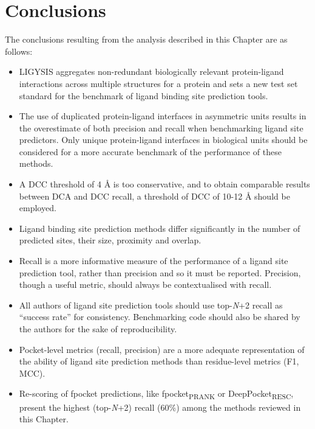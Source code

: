 \section{Conclusions}

The conclusions resulting from the analysis described in this Chapter are as follows:

\begin{itemize}

\item LIGYSIS aggregates non-redundant biologically relevant protein-ligand interactions across multiple structures for a protein and sets a new test set standard for the benchmark of ligand binding site prediction tools. 

\item The use of duplicated protein-ligand interfaces in asymmetric units results in the overestimate of both precision and recall when benchmarking ligand site predictors. Only unique protein-ligand interfaces in biological units should be considered for a more accurate benchmark of the performance of these methods.

\item A DCC threshold of 4 \AA{} is too conservative, and to obtain comparable results between DCA and DCC recall, a threshold of DCC of 10-12 \AA{} should be employed.

\item Ligand binding site prediction methods differ significantly in the number of predicted sites, their size, proximity and overlap.

\item Recall is a more informative measure of the performance of a ligand site prediction tool, rather than precision and so it must be reported. Precision, though a useful metric, should always be contextualised with recall.

\item All authors of ligand site prediction tools should use top-\textit{N}+2 recall as ``success rate'' for consistency. Benchmarking code should also be shared by the authors for the sake of reproducibility.

\item Pocket-level metrics (recall, precision) are a more adequate representation of the ability of ligand site prediction methods than residue-level metrics (F1, MCC).

\item Re-scoring of fpocket predictions, like fpocket\textsubscript{PRANK} or DeepPocket\textsubscript{RESC}, present the highest (top-\textit{N}+2) recall (60\%) among the methods reviewed in this Chapter.


\end{itemize}
